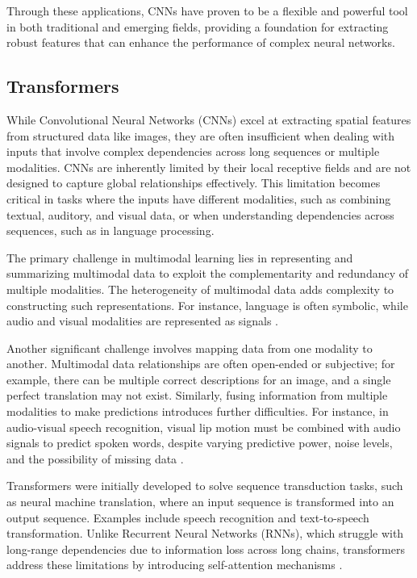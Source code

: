 Through these applications, CNNs have proven to be a flexible and powerful tool in both traditional and emerging fields, providing a foundation for extracting robust features that can enhance the performance of complex neural networks.

\subsection{Transformers}

While Convolutional Neural Networks (CNNs) excel at extracting spatial features from structured data like images, they are often insufficient when dealing with inputs that involve complex dependencies across long sequences or multiple modalities. CNNs are inherently limited by their local receptive fields and are not designed to capture global relationships effectively. This limitation becomes critical in tasks where the inputs have different modalities, such as combining textual, auditory, and visual data, or when understanding dependencies across sequences, such as in language processing.

The primary challenge in multimodal learning lies in representing and summarizing multimodal data to exploit the complementarity and redundancy of multiple modalities. The heterogeneity of multimodal data adds complexity to constructing such representations. For instance, language is often symbolic, while audio and visual modalities are represented as signals \cite{baltruvsaitis2018multimodal}.

Another significant challenge involves mapping data from one modality to another. Multimodal data relationships are often open-ended or subjective; for example, there can be multiple correct descriptions for an image, and a single perfect translation may not exist. Similarly, fusing information from multiple modalities to make predictions introduces further difficulties. For instance, in audio-visual speech recognition, visual lip motion must be combined with audio signals to predict spoken words, despite varying predictive power, noise levels, and the possibility of missing data \cite{baltruvsaitis2018multimodal}.

Transformers were initially developed to solve sequence transduction tasks, such as neural machine translation, where an input sequence is transformed into an output sequence. Examples include speech recognition and text-to-speech transformation. Unlike Recurrent Neural Networks (RNNs), which struggle with long-range dependencies due to information loss across long chains, transformers address these limitations by introducing self-attention mechanisms \cite{vaswani2017attention}.

